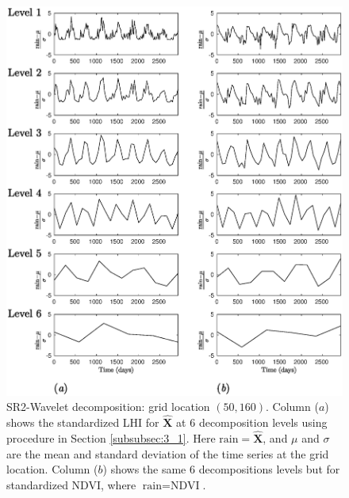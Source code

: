 {\begin{figure}[!htbp]
\begin{center}
\includegraphics[width=0.8\columnwidth]{fig/point50_160KrigingGG}
\vspace*{-0.2in}
\caption{SR2-Wavelet decomposition: grid location $(50,160)$. 
Column ($a$) shows the standardized LHI for $\bm{\hat{X}}$ at $6$ decomposition levels using procedure in Section \ref{subsubsec:3_1}. Here $\text{rain} = \bm{\hat{X}}$, and $\mu$ and $\sigma$ are the mean and standard deviation of the time series at the grid location. Column ($b$) shows the same $6$ decompositions levels but for standardized NDVI, where $\text{rain} = \text{NDVI}$.}
\label{fig:level_decomposition5}
\end{center}
\end{figure}

}
